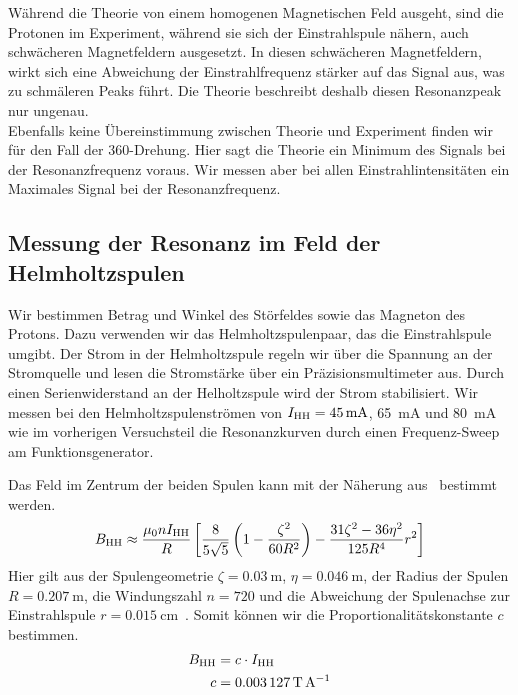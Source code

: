 \documentclass[paper=a4,
	fontsize=10pt,
	DIV=18,
	twocolumn,
	parskip=half
	]{scrartcl}
\numberwithin{equation}{section}    %
\begin{document}
Während die Theorie von einem homogenen Magnetischen Feld ausgeht, sind die Protonen im Experiment, während sie sich der Einstrahlspule nähern, auch schwächeren Magnetfeldern ausgesetzt. 
In diesen schwächeren Magnetfeldern, wirkt sich eine Abweichung der Einstrahlfrequenz stärker auf das Signal aus, was zu schmäleren Peaks führt.
Die Theorie beschreibt deshalb diesen Resonanzpeak nur ungenau.\\
Ebenfalls keine Übereinstimmung zwischen Theorie und Experiment finden wir für den Fall der $360$\textdegree -Drehung.
Hier sagt die Theorie ein Minimum des Signals bei der Resonanzfrequenz voraus. 
Wir messen aber bei allen Einstrahlintensitäten ein Maximales Signal bei der Resonanzfrequenz.

\subsection{Messung der Resonanz im Feld der Helmholtzspulen}
\label{auswertung6}

Wir bestimmen Betrag und Winkel des Störfeldes sowie das Magneton des Protons. Dazu verwenden wir das Helmholtzspulenpaar, das die Einstrahlspule umgibt. Der Strom in der Helmholtzspule regeln wir über die Spannung an der Stromquelle und lesen die Stromstärke über ein Präzisionsmultimeter aus. Durch einen Serienwiderstand an der Helholtzspule wird der Strom stabilisiert. Wir messen bei den Helmholtzspulenströmen von $I_{\rm HH} = \SI{45}{\milli\ampere}$, \SI{65}{\milli\ampere} und \SI{80}{\milli\ampere} wie im vorherigen Versuchsteil die Resonanzkurven durch einen Frequenz-Sweep am Funktionsgenerator. 

Das Feld im Zentrum der beiden Spulen kann mit der Näherung aus~\citet{anleitung} bestimmt werden.
\begin{equation}
	B_{\rm HH} \approx \frac{\mu_0 n I_{\rm HH}}{R} \left[ \frac{8}{5\sqrt{5}} \left( 1 - \frac{\zeta^2}{60R^2} \right) - \frac{31\zeta^2 - 36\eta^2}{125 R^4}r^2\right]
\end{equation}
Hier gilt aus der Spulengeometrie $\zeta=\SI{0.03}{\meter}$, $\eta=\SI{0.046}{\meter}$, der Radius der Spulen $R=\SI{0.207}{\meter}$, die Windungszahl $n=720$ und die Abweichung der Spulenachse zur Einstrahlspule $r=\SI{0.015}{\centi\meter}$~\citep{anleitung}. Somit können wir die Proportionalitätskonstante $c$ bestimmen.
\begin{align}
	B_{\rm HH} &= c\cdot I_{\rm HH}\\
	c &= \SI{0.003127}{\tesla\per\ampere}
\end{align}
\end{document}
